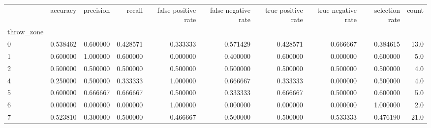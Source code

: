 \begin{tabular}{lrrrrrrrrr}
\toprule
{} &  accuracy &  precision &    recall &  false positive rate &  false negative rate &  true positive rate &  true negative rate &  selection rate &  count \\
throw\_zone &           &            &           &                      &                      &                     &                     &                 &        \\
\midrule
0          &  0.538462 &   0.600000 &  0.428571 &             0.333333 &             0.571429 &            0.428571 &            0.666667 &        0.384615 &   13.0 \\
1          &  0.600000 &   1.000000 &  0.600000 &             0.000000 &             0.400000 &            0.600000 &            0.000000 &        0.600000 &    5.0 \\
2          &  0.500000 &   0.500000 &  0.500000 &             0.500000 &             0.500000 &            0.500000 &            0.500000 &        0.500000 &    4.0 \\
4          &  0.250000 &   0.500000 &  0.333333 &             1.000000 &             0.666667 &            0.333333 &            0.000000 &        0.500000 &    4.0 \\
5          &  0.600000 &   0.666667 &  0.666667 &             0.500000 &             0.333333 &            0.666667 &            0.500000 &        0.600000 &    5.0 \\
6          &  0.000000 &   0.000000 &  0.000000 &             1.000000 &             0.000000 &            0.000000 &            0.000000 &        1.000000 &    2.0 \\
7          &  0.523810 &   0.300000 &  0.500000 &             0.466667 &             0.500000 &            0.500000 &            0.533333 &        0.476190 &   21.0 \\
\bottomrule
\end{tabular}
